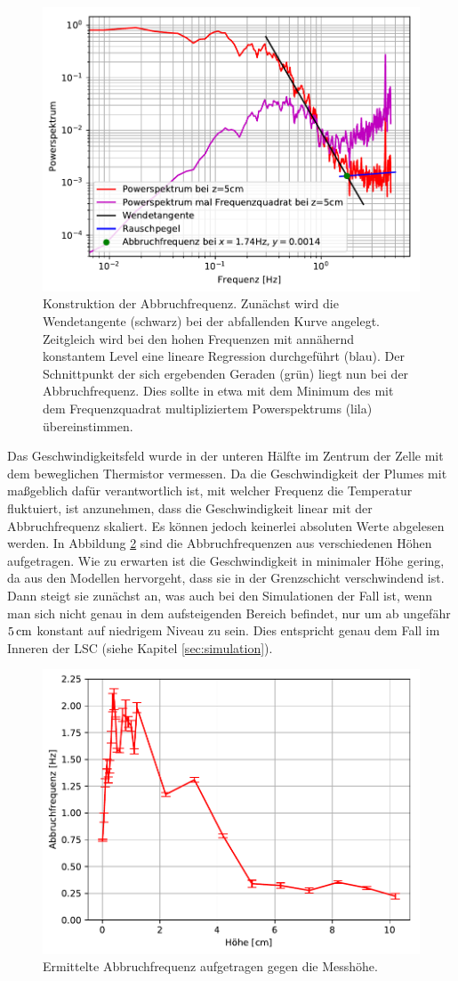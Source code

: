 \documentclass[12pt,a4paper,titlepage,headinclude]{scrartcl}
\numberwithin{equation}{subsection}
\begin{document}
\begin{figure}[h]
	\centering
	\includegraphics[width=0.7\linewidth]{abbruchfrequenz}
	\caption{Konstruktion der Abbruchfrequenz. Zunächst wird die Wendetangente (schwarz) bei der abfallenden Kurve angelegt. Zeitgleich wird bei den hohen Frequenzen mit annähernd konstantem Level eine lineare Regression durchgeführt (blau). Der Schnittpunkt der sich ergebenden Geraden (grün) liegt nun bei der Abbruchfrequenz. Dies sollte in etwa mit dem Minimum des mit dem Frequenzquadrat multipliziertem Powerspektrums (lila) übereinstimmen.}
	\label{fig:abbruchfreq}
\end{figure}

Das Geschwindigkeitsfeld wurde in der unteren Hälfte im Zentrum der Zelle mit dem beweglichen Thermistor vermessen.
Da die Geschwindigkeit der Plumes mit maßgeblich dafür verantwortlich ist, mit welcher Frequenz die Temperatur fluktuiert, ist anzunehmen, dass die Geschwindigkeit linear mit der Abbruchfrequenz skaliert.
Es können jedoch keinerlei absoluten Werte abgelesen werden. 
In Abbildung \ref{fig:abbruchhoehe} sind die Abbruchfrequenzen aus verschiedenen Höhen aufgetragen.
Wie zu erwarten ist die Geschwindigkeit in minimaler Höhe gering, da aus den Modellen hervorgeht, dass sie in der Grenzschicht verschwindend ist.
Dann steigt sie zunächst an, was auch bei den Simulationen der Fall ist, wenn man sich nicht genau in dem aufsteigenden Bereich befindet, nur um ab ungefähr $\SI5{\centi\meter}$ konstant auf niedrigem Niveau zu sein.
Dies entspricht genau dem Fall im Inneren der LSC (siehe Kapitel \ref{sec:simulation}).

\begin{figure}[h]
	\centering
	\includegraphics[width=0.7\linewidth]{abbruch_result}
	\caption{Ermittelte Abbruchfrequenz aufgetragen gegen die Messhöhe.}
	\label{fig:abbruchhoehe}
\end{figure}
\end{document}
